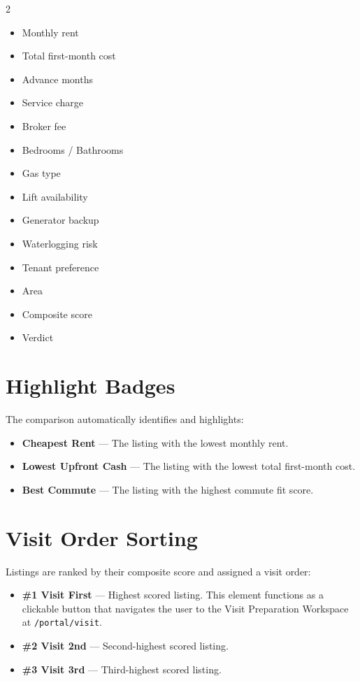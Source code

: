 \documentclass[12pt, a4paper, oneside]{report}
\begin{document}
\begin{multicols}{2}
\begin{itemize}[leftmargin=1em]
  \item Monthly rent
  \item Total first-month cost
  \item Advance months
  \item Service charge
  \item Broker fee
  \item Bedrooms / Bathrooms
  \item Gas type
  \item Lift availability
  \item Generator backup
  \item Waterlogging risk
  \item Tenant preference
  \item Area
  \item Composite score
  \item Verdict
\end{itemize}
\end{multicols}

\section{Highlight Badges}

The comparison automatically identifies and highlights:

\begin{itemize}[leftmargin=2em]
  \item \textbf{Cheapest Rent} --- The listing with the lowest monthly rent.
  \item \textbf{Lowest Upfront Cash} --- The listing with the lowest total first-month cost.
  \item \textbf{Best Commute} --- The listing with the highest commute fit score.
\end{itemize}

\section{Visit Order Sorting}

Listings are ranked by their composite score and assigned a visit order:

\begin{itemize}[leftmargin=2em]
  \item \textbf{\#1 Visit First} --- Highest scored listing. This element functions as a clickable button that navigates the user to the Visit Preparation Workspace at \texttt{/portal/visit}.
  \item \textbf{\#2 Visit 2nd} --- Second-highest scored listing.
  \item \textbf{\#3 Visit 3rd} --- Third-highest scored listing.
\end{itemize}
\end{document}
